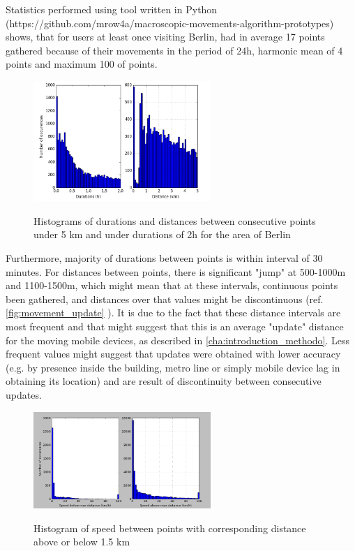 Statistics performed using tool written in Python (https://github.com/mrow4a/macroscopic-movements-algorithm-prototypes) shows, that for users at least once visiting Berlin, had in average 17 points gathered because of their movements in the period of 24h, harmonic mean of 4 points and maximum 100 of points.
\\
\begin{figure}[!ht]
	\centering
	\includegraphics[width=0.6\textwidth]{images/berlin_stats_intro.png}\\
	\caption{Histograms of durations and distances between consecutive points under 5 km and under durations of 2h for the area of Berlin}
	\label{fig:ber_stats}
\end{figure}
\FloatBarrier
Furthermore, majority of durations between points is within interval of 30 minutes. For distances between points, there is significant "jump" at 500-1000m and 1100-1500m, which might mean that at these intervals, continuous points been gathered, and distances over that values might be discontinuous (ref. \autoref{fig:movement_update} ). It is due to the fact that these distance intervals are most frequent and that might suggest that this is an average "update" distance for the moving mobile devices, as described in \autoref{cha:introduction_methodo}. Less frequent values might suggest that updates were obtained with lower accuracy (e.g. by presence inside the building, metro line or simply mobile device lag in obtaining its location) and are result of discontinuity between consecutive updates.
\begin{figure}[!ht]
	\centering
	\includegraphics[width=0.6\textwidth]{images/berlin_speeds_distances.png}\\
	\caption{Histogram of speed between points with corresponding distance above or below 1.5 km}
	\label{fig:ber_sp_dis}
\end{figure}
